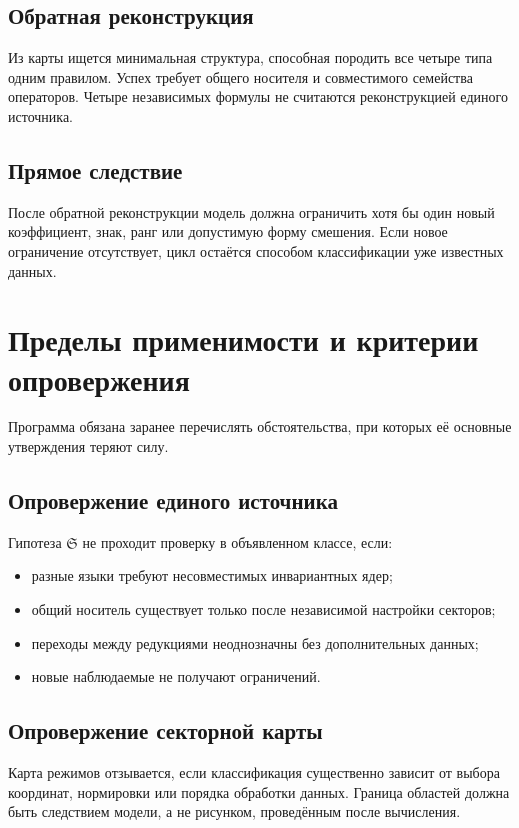 \section{Обратная реконструкция}

Из карты ищется минимальная структура, способная породить все четыре типа
одним правилом. Успех требует общего носителя и совместимого семейства
операторов. Четыре независимых формулы не считаются реконструкцией единого
источника.

\section{Прямое следствие}

После обратной реконструкции модель должна ограничить хотя бы один новый
коэффициент, знак, ранг или допустимую форму смешения. Если новое ограничение
отсутствует, цикл остаётся способом классификации уже известных данных.

\chapter{Пределы применимости и критерии опровержения}

Программа обязана заранее перечислять обстоятельства, при которых её основные
утверждения теряют силу.

\section{Опровержение единого источника}

Гипотеза $\mathfrak S$ не проходит проверку в объявленном классе, если:
\begin{itemize}
 \item разные языки требуют несовместимых инвариантных ядер;
 \item общий носитель существует только после независимой настройки секторов;
 \item переходы между редукциями неоднозначны без дополнительных данных;
 \item новые наблюдаемые не получают ограничений.
\end{itemize}

\section{Опровержение секторной карты}

Карта режимов отзывается, если классификация существенно зависит от выбора
координат, нормировки или порядка обработки данных. Граница областей должна
быть следствием модели, а не рисунком, проведённым после вычисления.

